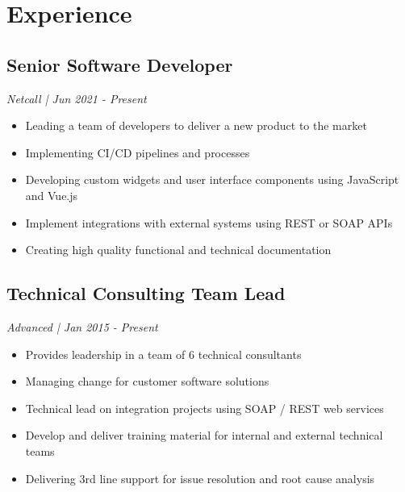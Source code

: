 %
%
\section{Experience}
%
%
\subsection{Senior Software Developer}
\textit{ Netcall | Jun 2021 - Present }
\begin{itemize}
\vspace{6pt}
	\item Leading a team of developers to deliver a new product to the market
	\item Implementing CI/CD pipelines and processes
	\item Developing custom widgets and user interface components using JavaScript and Vue.js
	\item Implement integrations with external systems using REST or SOAP APIs
	\item Creating high quality functional and technical documentation
\end{itemize}

%
%
\subsection{Technical Consulting Team Lead}
\textit{ Advanced | Jan 2015 - Present }
\begin{itemize}
\vspace{6pt}
	\item Provides leadership in a team of 6 technical consultants
	\item Managing change for customer software solutions
	\item Technical lead on integration projects using SOAP / REST web services
	\item Develop and deliver training material for internal and external technical teams
	\item Delivering 3rd line support for issue resolution and root cause analysis
\end{itemize}

%
%
